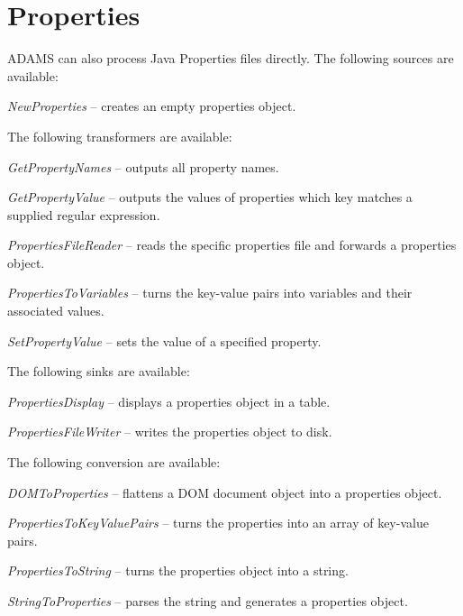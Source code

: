 \section{Properties}
\label{properties}
ADAMS can also process Java Properties files directly.
The following sources are available:
\begin{tight_itemize}
	\item \textit{NewProperties} -- creates an empty properties object.
\end{tight_itemize}
The following transformers are available:
\begin{tight_itemize}
	\item \textit{GetPropertyNames} -- outputs all property names.
	\item \textit{GetPropertyValue} -- outputs the values of properties
	which key matches a supplied regular expression.
	\item \textit{PropertiesFileReader} -- reads the specific properties file 
	and forwards a properties object.
	\item \textit{PropertiesToVariables} -- turns the key-value pairs into
	 variables and their associated values.
	\item \textit{SetPropertyValue} -- sets the value of a specified property.
\end{tight_itemize}
The following sinks are available:
\begin{tight_itemize}
	\item \textit{PropertiesDisplay} -- displays a properties object in a table.
	\item \textit{PropertiesFileWriter} -- writes the properties object to disk.
\end{tight_itemize}
The following conversion are available:
\begin{tight_itemize}
	\item \textit{DOMToProperties} -- flattens a DOM document object into a 
	properties object.
	\item \textit{PropertiesToKeyValuePairs} -- turns the properties into an
	array of key-value pairs.
	\item \textit{PropertiesToString} -- turns the properties object into a string.
	\item \textit{StringToProperties} -- parses the string and generates a properties object.
\end{tight_itemize}


\newpage
